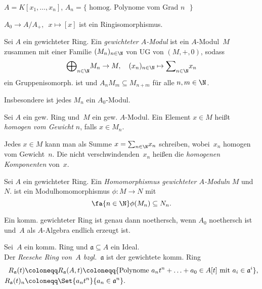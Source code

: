 \documentclass{cheat-sheet}
\newcommand{\aaa}{\mathfrak{a}}
\begin{document}
\begin{bsp}
  $A = K[x_1, \ldots, x_n]$, $A_n = \{ \text{ homog. Polynome vom Grad $n$ } \}$
\end{bsp}

\begin{prop}
  $A_0 \to A / A_+, \enspace x \mapsto [x]$ \quad
  ist ein Ringisomorphismus.
\end{prop}

\begin{defn}
  Sei $A$ ein gewichteter Ring.
  Ein \emph{gewichteter $A$-Modul} ist ein $A$-Modul~$M$ zusammen mit einer Familie $(M_n)_{n \in \N}$ von UG von $(M, +, 0)$, sodass
  \[
    {\bigoplus}_{n \in \N} M_n \to M, \quad
    (x_n)_{n \in \N} \mapsto {\sum}_{n \in \N} x_n
  \]
  ein Gruppenisomorph. ist und $A_n M_m \subseteq M_{n+m}$ für alle $n, m \in \N$.
\end{defn}

\begin{bem}
  Insbesondere ist jedes $M_n$ ein $A_0$-Modul.
\end{bem}

\begin{sprechweise}
  Sei $A$ ein gew. Ring und~$M$ ein gew. $A$-Modul.
  Ein Element $x \in M$ heißt \emph{homogen} \textit{vom Gewicht $n$}, falls $x \in M_n$.
\end{sprechweise}

\begin{bem}
  Jedes $x \in M$ kann man als Summe $x = {\sum}_{n \in \N} x_n$ schreiben, wobei~$x_n$ homogen vom Gewicht~$n$.
  Die nicht verschwindenden~$x_n$ heißen die \textit{homogenen Komponenten} von~$x$.
\end{bem}

\begin{defn}
  Sei $A$ ein gewichteter Ring.
  Ein \textit{Homomorphismus gewichteter $A$-Moduln} $M$ und~$N$. ist ein Modulhomomorphismus $\phi : M \to N$ mit
  \[
    \fa{n \in \N} \phi(M_n) \subseteq N_n.
  \]
\end{defn}


\begin{prop}
  Ein komm. gewichteter Ring ist genau dann noethersch, wenn $A_0$ noethersch ist und~$A$ als $A$-Algebra endlich erzeugt ist.
\end{prop}


\begin{defn}
  Sei~$A$ ein komm. Ring und $\aaa \subseteq A$ ein Ideal. \\
  Der \emph{Reesche Ring} \textit{von~$A$ bzgl.~$\aaa$} ist der gewichtete komm. Ring
  \begin{align*}
    R_\aaa(t) & \coloneqq R_\aaa(A, t) \coloneqq \{ \text{Polynome } a_n t^n + \ldots + a_0 \in A[t] \text{ mit } a_i \in \aaa^i \}, \\
    R_\aaa(t)_n & \coloneqq \Set{a_n t^n}{a_n \in \aaa^n}.
  \end{align*}
\end{defn}
\end{document}
